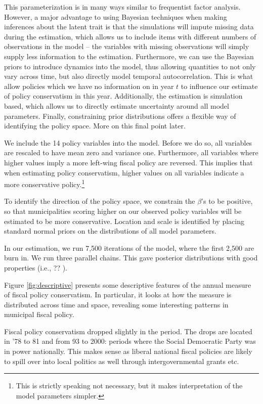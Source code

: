 \documentclass[a4paper,12pt]{article}
\begin{document}
This parameterization is in many ways similar to frequentist factor analysis. However, a major advantage to using Bayesian techniques when making inferences about the latent trait is that the simulations will impute missing data during the estimation, which allows us to include items with different numbers of observations in the model -- the variables with missing observations will simply supply less information to the estimation. Furthermore, we can use the Bayesian priors to introduce dynamics into the model, thus allowing quantities to not only vary across time, but also directly model temporal autocorrelation. This is what allow policies which we have no information on in year $t$ to influence our estimate of policy conservatism in this year. Additionally, the estimation is simulation based, which allows us to directly estimate uncertainty around all model parameters. Finally, constraining prior distributions offers a flexible way of identifying the policy space. More on this final point later.

We include the 14 policy variables into the model. Before we do so, all variables are rescaled to have mean zero and variance one. Furthermore, all variables where higher values imply a more left-wing fiscal policy are reversed. This implies that when estimating policy conservatism, higher values on all variables indicate a more conservative policy.\footnote{This is strictly speaking not necessary, but it makes interpretation of the model parameters simpler.}

To identify the direction of the policy space, we constrain the $\beta$'s to be positive, so that municipalities scoring higher on our observed policy variables will be estimated to be more conservative. Location and scale is identified by placing standard normal priors on the distributions of all model parameters. %

In our estimation, we run 7,500 iterations of the model, where the first 2,500 are burn in. We run three parallel chains. This gave posterior distributions with good properties (i.e., ?? ).

Figure \ref{fig:descriptive} presents some descriptive features of the annual measure of fiscal policy conservatism. In particular, it looks at how the measure is distributed across time and space, revealing some interesting patterns in municipal fiscal policy.

Fiscal policy conservatism dropped slightly in the period. The drops are located in '78 to 81 and from 93 to 2000: periods where the Social Democratic Party was in power nationally. This makes sense as liberal national fiscal policies are likely to spill over into local politics as well through intergovernmental grants etc.
\end{document}
